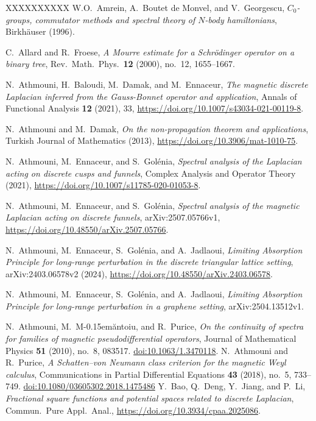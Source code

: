 \documentclass[10pt]{amsart} %
\newcommand{\1}{{\mathbb{I}}}
\numberwithin{equation}{section}
\begin{document}
\begin{thebibliography}{XXXXXXXXXX}
 W.O.\ Amrein, A.\ Boutet de Monvel, and V.\ Georgescu, \emph{$C_0$-groups, commutator methods and spectral theory of $N$-body hamiltonians}, Birkh\"auser (1996).

 C.\ Allard and R.\ Froese, \emph{A Mourre estimate for a Schr\"{o}dinger operator on a binary tree}, Rev.\ Math.\ Phys.\ {\bf 12} (2000), no.\ 12, 1655--1667.

 N.\ Athmouni, H.\ Baloudi, M.\ Damak, and M.\ Ennaceur, \emph{The magnetic discrete Laplacian inferred from the Gauss-Bonnet operator and application}, Annals of Functional Analysis {\bf 12} (2021), 33, \url{https://doi.org/10.1007/s43034-021-00119-8}.

 N.\ Athmouni and M.\ Damak, \emph{On the non-propagation theorem and applications}, Turkish Journal of Mathematics (2013), \url{https://doi.org/10.3906/mat-1010-75}.

 N.\ Athmouni, M.\ Ennaceur, and S.\ Gol\'enia, \emph{Spectral analysis of the Laplacian acting on discrete cusps and funnels}, Complex Analysis and Operator Theory (2021), \url{https://doi.org/10.1007/s11785-020-01053-8}.

 N.\ Athmouni, M.\ Ennaceur, and S.\ Gol\'enia, \emph{Spectral analysis of the magnetic Laplacian acting on discrete funnels}, arXiv:2507.05766v1, \url{https://doi.org/10.48550/arXiv.2507.05766}.

 N.\ Athmouni, M.\ Ennaceur, S.\ Gol\'enia, and A.\ Jadlaoui, \emph{Limiting Absorption Principle for long-range perturbation in the discrete triangular lattice setting}, arXiv:2403.06578v2 (2024), \url{https://doi.org/10.48550/arXiv.2403.06578}.

 N.\ Athmouni, M.\ Ennaceur, S.\ Gol\'enia, and A.\ Jadlaoui, \emph{Limiting Absorption Principle for long-range perturbation in a graphene setting}, arXiv:2504.13512v1.

N.~Athmouni, M.~M\kern-0.15em\u{a}ntoiu, and R.~Purice,
\emph{On the continuity of spectra for families of magnetic pseudodifferential operators},
Journal of Mathematical Physics \textbf{51} (2010), no.~8, 083517.
\href{https://doi.org/10.1063/1.3470118}{doi:10.1063/1.3470118}.
N.~Athmouni and R.~Purice,
\emph{A Schatten--von Neumann class criterion for the magnetic Weyl calculus},
Communications in Partial Differential Equations \textbf{43} (2018), no.~5, 733--749.
\href{https://doi.org/10.1080/03605302.2018.1475486}{doi:10.1080/03605302.2018.1475486}
 Y.\ Bao, Q.\ Deng, Y.\ Jiang, and P.\ Li, \emph{Fractional square functions and potential spaces related to discrete Laplacian}, Commun.\ Pure Appl.\ Anal., \url{https://doi.org/10.3934/cpaa.2025086}.


\end{thebibliography}
\end{document}
